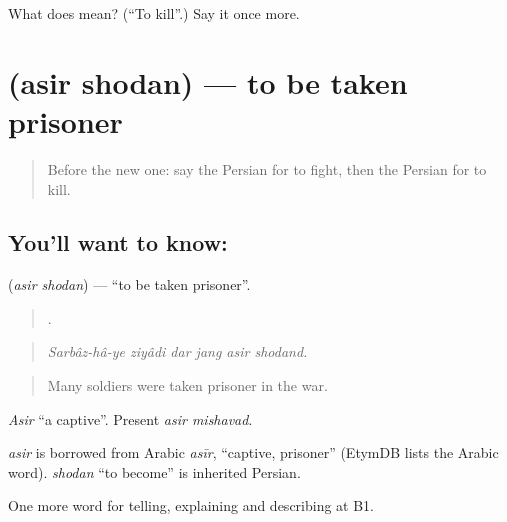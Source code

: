 \begin{tcolorbox}[breakable,colback=teal!4,colframe=teal!35!black,title={Before you move on}]
What does  mean? (\textquotedblleft{}To kill\textquotedblright{}.) Say it once more.
\end{tcolorbox}
\section[\texorpdfstring{\fa{اسیر} \fa{شدن} (asir shodan)}{اسیر شدن (asir shodan)}]{  (asir shodan) — to be taken prisoner}

\label{lesson:FA-C349-asir-shodan}



\begin{quote}
Before the new one: say the Persian for to fight, then the Persian for to kill.
\end{quote}

\subsection*{You'll want to know:  }
\textbf{ } (\emph{asir shodan}) — \textquotedblleft{}to be taken prisoner\textquotedblright{}.

\begin{quote}
     .
\end{quote}

\begin{quote}
\emph{Sarbâz-hâ-ye ziyâdi dar jang asir shodand.}
\end{quote}

\begin{quote}
Many soldiers were taken prisoner in the war.
\end{quote}

\emph{Asir} \textquotedblleft{}a captive\textquotedblright{}. Present \emph{asir mishavad}.

\begin{cousinweb}
\emph{asir} is borrowed from Arabic \emph{asīr}, \textquotedblleft{}captive, prisoner\textquotedblright{} (EtymDB lists the Arabic word). \emph{shodan} \textquotedblleft{}to become\textquotedblright{} is inherited Persian.
\end{cousinweb}

\begin{grammarlens}[title={What you've built}]
One more word for telling, explaining and describing at B1.
\end{grammarlens}

